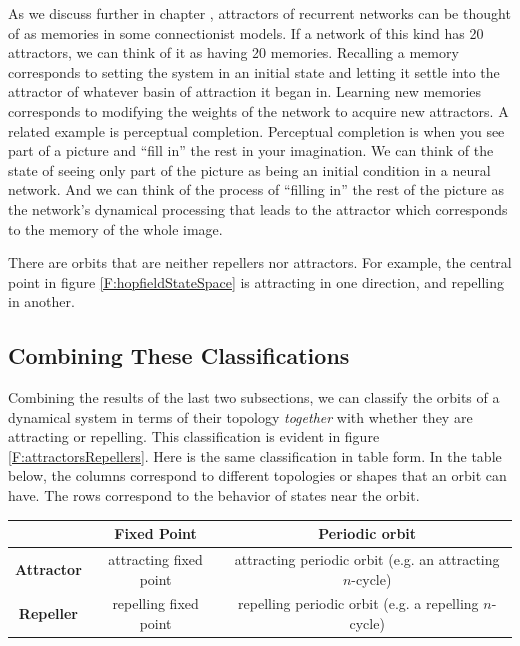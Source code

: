 As we discuss further in chapter , attractors of recurrent networks can be thought of as memories in some connectionist models. If a network of this kind has 20  attractors, we can think of it as having 20 memories. Recalling a memory corresponds to setting the system in an initial state and letting it settle into the attractor of whatever basin of attraction it began in. Learning new memories corresponds to modifying the weights of the network to acquire new attractors. A related  example is perceptual completion. Perceptual completion is when you see part
of a picture and ``fill in'' the rest in your imagination. We can think of
the state of seeing only part of the picture as being an initial condition in a
neural network. And we can think of the process of ``filling in'' the rest of
the picture as the network's dynamical processing that leads to the attractor
which corresponds to the memory of the whole image.

There are orbits that are neither repellers nor attractors. For example, the central point in figure \ref{F:hopfieldStateSpace} is attracting in one direction, and repelling in another.

\subsection{Combining These Classifications}

Combining the results of the last two subsections, we can classify the orbits of a dynamical system in terms of their topology \emph{together} with whether they are attracting or repelling. This classification is evident in figure \ref{F:attractorsRepellers}. Here is the same classification in table form. In the table below, the columns correspond to different topologies or shapes  that an orbit can have. The rows correspond to the behavior of states near the orbit.

\begin{center}
\begin{tabular}{| c | c | c |}
\hline
& {\bf Fixed Point} & {\bf Periodic orbit}  \\
\hline
{\bf Attractor} & attracting fixed point & attracting periodic orbit (e.g. an attracting $n$-cycle) \\
\hline
{\bf Repeller} &  repelling fixed point & repelling periodic orbit  (e.g. a repelling $n$-cycle)  \\
\hline
\end{tabular}
\end{center}

